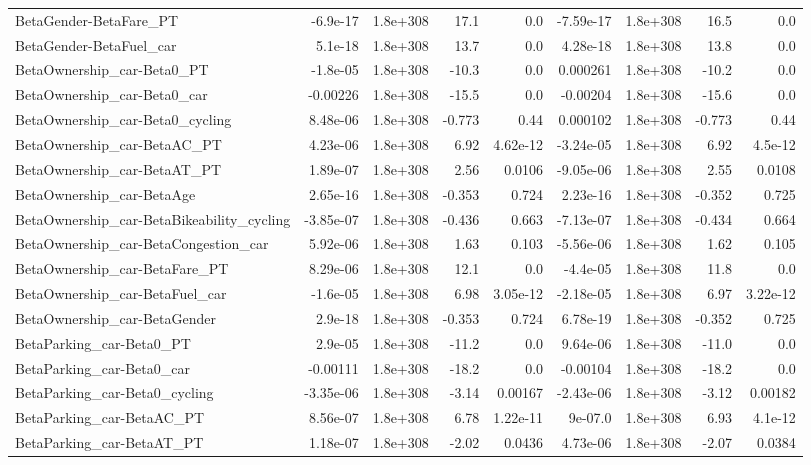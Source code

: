 \begin{tabular}{lrrrrrrrr}
BetaGender-BetaFare_PT & -6.9e-17 & 1.8e+308 & 17.1 & 0.0 & -7.59e-17 & 1.8e+308 & 16.5 & 0.0 \\
BetaGender-BetaFuel_car & 5.1e-18 & 1.8e+308 & 13.7 & 0.0 & 4.28e-18 & 1.8e+308 & 13.8 & 0.0 \\
BetaOwnership_car-Beta0_PT & -1.8e-05 & 1.8e+308 & -10.3 & 0.0 & 0.000261 & 1.8e+308 & -10.2 & 0.0 \\
BetaOwnership_car-Beta0_car & -0.00226 & 1.8e+308 & -15.5 & 0.0 & -0.00204 & 1.8e+308 & -15.6 & 0.0 \\
BetaOwnership_car-Beta0_cycling & 8.48e-06 & 1.8e+308 & -0.773 & 0.44 & 0.000102 & 1.8e+308 & -0.773 & 0.44 \\
BetaOwnership_car-BetaAC_PT & 4.23e-06 & 1.8e+308 & 6.92 & 4.62e-12 & -3.24e-05 & 1.8e+308 & 6.92 & 4.5e-12 \\
BetaOwnership_car-BetaAT_PT & 1.89e-07 & 1.8e+308 & 2.56 & 0.0106 & -9.05e-06 & 1.8e+308 & 2.55 & 0.0108 \\
BetaOwnership_car-BetaAge & 2.65e-16 & 1.8e+308 & -0.353 & 0.724 & 2.23e-16 & 1.8e+308 & -0.352 & 0.725 \\
BetaOwnership_car-BetaBikeability_cycling & -3.85e-07 & 1.8e+308 & -0.436 & 0.663 & -7.13e-07 & 1.8e+308 & -0.434 & 0.664 \\
BetaOwnership_car-BetaCongestion_car & 5.92e-06 & 1.8e+308 & 1.63 & 0.103 & -5.56e-06 & 1.8e+308 & 1.62 & 0.105 \\
BetaOwnership_car-BetaFare_PT & 8.29e-06 & 1.8e+308 & 12.1 & 0.0 & -4.4e-05 & 1.8e+308 & 11.8 & 0.0 \\
BetaOwnership_car-BetaFuel_car & -1.6e-05 & 1.8e+308 & 6.98 & 3.05e-12 & -2.18e-05 & 1.8e+308 & 6.97 & 3.22e-12 \\
BetaOwnership_car-BetaGender & 2.9e-18 & 1.8e+308 & -0.353 & 0.724 & 6.78e-19 & 1.8e+308 & -0.352 & 0.725 \\
BetaParking_car-Beta0_PT & 2.9e-05 & 1.8e+308 & -11.2 & 0.0 & 9.64e-06 & 1.8e+308 & -11.0 & 0.0 \\
BetaParking_car-Beta0_car & -0.00111 & 1.8e+308 & -18.2 & 0.0 & -0.00104 & 1.8e+308 & -18.2 & 0.0 \\
BetaParking_car-Beta0_cycling & -3.35e-06 & 1.8e+308 & -3.14 & 0.00167 & -2.43e-06 & 1.8e+308 & -3.12 & 0.00182 \\
BetaParking_car-BetaAC_PT & 8.56e-07 & 1.8e+308 & 6.78 & 1.22e-11 & 9e-07.0 & 1.8e+308 & 6.93 & 4.1e-12 \\
BetaParking_car-BetaAT_PT & 1.18e-07 & 1.8e+308 & -2.02 & 0.0436 & 4.73e-06 & 1.8e+308 & -2.07 & 0.0384 \\

\end{tabular}
